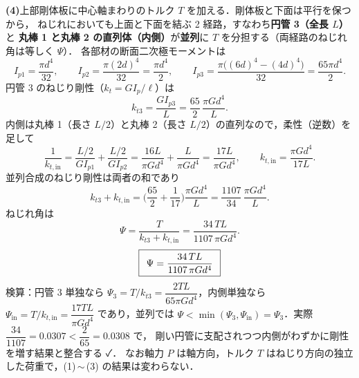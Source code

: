 \documentclass[11pt,a4paper]{article}
\begin{document}
\medskip
\noindent\textbf{(4)}\quad 上部剛体板に中心軸まわりのトルク $T$ を加える．剛体板と下面は平行を保つから，
ねじれにおいても上面と下面を結ぶ 2 経路，すなわち\textbf{円管 3（全長 $L$）}と
\textbf{丸棒 1 と丸棒 2 の直列体（内側）}が\textbf{並列}に $T$ を分担する（両経路のねじれ角は等しく $\Psi$）．
各部材の断面二次極モーメントは
\[
  I_{p1}=\frac{\pi d^4}{32},\qquad I_{p2}=\frac{\pi (2d)^4}{32}=\frac{\pi d^4}{2},\qquad
  I_{p3}=\frac{\pi\big((6d)^4-(4d)^4\big)}{32}=\frac{65\pi d^4}{2}.
\]
円管 3 のねじり剛性（$k_t=GI_p/\ell$）は
\[
  k_{t3}=\frac{G I_{p3}}{L}=\frac{65}{2}\,\frac{\pi G d^4}{L}.
\]
内側は丸棒 1（長さ $L/2$）と丸棒 2（長さ $L/2$）の直列なので，柔性（逆数）を足して
\[
  \frac{1}{k_{t,\text{in}}}=\frac{L/2}{G I_{p1}}+\frac{L/2}{G I_{p2}}
  =\frac{16L}{\pi G d^4}+\frac{L}{\pi G d^4}=\frac{17L}{\pi G d^4},\qquad
  k_{t,\text{in}}=\frac{\pi G d^4}{17L}.
\]
並列合成のねじり剛性は両者の和であり
\[
  k_{t3}+k_{t,\text{in}}=\Big(\frac{65}{2}+\frac{1}{17}\Big)\frac{\pi G d^4}{L}
  =\frac{1107}{34}\,\frac{\pi G d^4}{L}.
\]
ねじれ角は
\[
  \Psi=\frac{T}{k_{t3}+k_{t,\text{in}}}=\frac{34\,TL}{1107\,\pi G d^4}.
\]
\[
  \boxed{\,\;\Psi=\dfrac{34\,TL}{1107\,\pi G d^4}\;\,}
\]
検算：円管 3 単独なら $\Psi_3=T/k_{t3}=\dfrac{2TL}{65\pi G d^4}$，内側単独なら
$\Psi_{\text{in}}=T/k_{t,\text{in}}=\dfrac{17TL}{\pi G d^4}$ であり，並列では
$\Psi<\min(\Psi_3,\Psi_{\text{in}})=\Psi_3$．実際 $\dfrac{34}{1107}=0.0307<\dfrac{2}{65}=0.0308$ で，
剛い円管に支配されつつ内側がわずかに剛性を増す結果と整合する ✓．
なお軸力 $P$ は軸方向，トルク $T$ はねじり方向の独立した荷重で，(1)\,$\sim$\,(3) の結果は変わらない．
\end{document}

